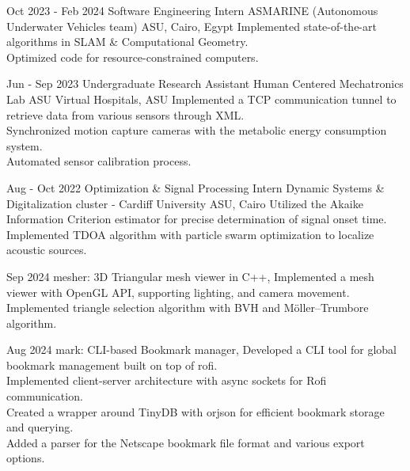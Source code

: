 \documentclass[]{report}
\begin{document}
\vspace{4mm}


\entry
    {Oct 2023 - Feb 2024}
    {Software Engineering Intern}
    {ASMARINE (Autonomous Underwater Vehicles team)}
    {ASU, Cairo, Egypt}
    {
      \tb Implemented state-of-the-art algorithms in SLAM \& Computational Geometry. \\
      \tb Optimized code for resource-constrained computers.
    }

\entry
    {Jun - Sep 2023}
    {Undergraduate Research Assistant}
    {Human Centered Mechatronics Lab}
    {ASU Virtual Hospitals, ASU}
    {
      \tb Implemented a TCP communication tunnel to retrieve data from various sensors through XML. \\
      \tb Synchronized motion capture cameras with the metabolic energy consumption system. \\
      \tb Automated sensor calibration process.
    }

\entry
    {Aug - Oct 2022}
    {Optimization \& Signal Processing Intern}
    {Dynamic Systems \& Digitalization cluster - Cardiff University}
    {ASU, Cairo}
    {
      \tb Utilized the Akaike Information Criterion estimator for precise determination of signal onset time.\\
      \tb Implemented TDOA algorithm with particle swarm optimization to localize acoustic sources.
    }



\entry
    {Sep 2024}
    {mesher: 3D Triangular mesh viewer in C++, }
    {}{}
    {
        \tb Implemented a mesh viewer with OpenGL API, supporting lighting, and camera movement.\\
        \tb Implemented triangle selection algorithm with BVH and Möller–Trumbore algorithm.
    }

\entry
    {Aug 2024}
    {mark: CLI-based Bookmark manager, }
    {} {}
    {
        \tb Developed a CLI tool for global bookmark management built on top of rofi.\\ 
        \tb Implemented client-server architecture with async sockets for Rofi communication.\\
        \tb Created a wrapper around TinyDB with orjson for efficient bookmark storage and querying.\\ 
        \tb Added a parser for the Netscape bookmark file format and various export options.
    }
\end{document}
